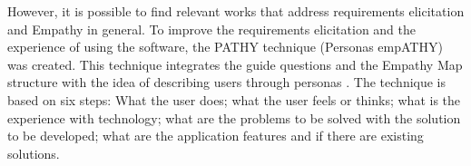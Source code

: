 \documentclass[conference]{IEEEtran}
\begin{document}

However, it is possible to find relevant works that address requirements elicitation and Empathy in general. To improve the requirements elicitation and the experience of using the software, the PATHY technique (Personas empATHY) \cite{DBLP:conf/sbes/FerreiraCB15} was created. This technique integrates the guide questions and the Empathy Map structure with the idea of describing users through personas \cite{DBLP:conf/sbes/FerreiraCB15}. The technique is based on six steps: What the user does; what the user feels or thinks; what is the experience with technology; what are the problems to be solved with the solution to be developed; what are the application features and if there are existing solutions.

\end{document}
